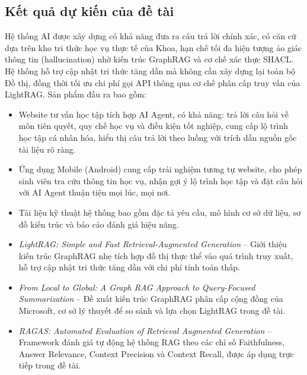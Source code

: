 \documentclass{article}[13pt]
\begin{document}
{    \subsection{Kết quả dự kiến của đề tài}

    Hệ thống AI được xây dựng có khả năng đưa ra câu trả lời chính xác, có căn cứ dựa trên kho tri thức học vụ thực tế của Khoa, hạn chế tối đa hiện tượng ảo giác thông tin (hallucination) nhờ kiến trúc GraphRAG và cơ chế xác thực SHACL. Hệ thống hỗ trợ cập nhật tri thức tăng dần mà không cần xây dựng lại toàn bộ Đồ thị, đồng thời tối ưu chi phí gọi API thông qua cơ chế phân cấp truy vấn của LightRAG. Sản phẩm đầu ra bao gồm:

    \begin{itemize}[label={--}, leftmargin=1.5em]
        \item Website tư vấn học tập tích hợp AI Agent, có khả năng: trả lời câu hỏi về môn tiên quyết, quy chế học vụ và điều kiện tốt nghiệp, cung cấp lộ trình học tập cá nhân hóa, hiển thị câu trả lời theo luồng với trích dẫn nguồn gốc tài liệu rõ ràng.
        \item Ứng dụng Mobile (Android) cung cấp trải nghiệm tương tự website, cho phép sinh viên tra cứu thông tin học vụ, nhận gợi ý lộ trình học tập và đặt câu hỏi với AI Agent thuận tiện mọi lúc, mọi nơi.
        \item Tài liệu kỹ thuật hệ thống bao gồm đặc tả yêu cầu, mô hình cơ sở dữ liệu, sơ đồ kiến trúc và báo cáo đánh giá hiệu năng.
    \end{itemize}

    \begin{itemize}[label={--}, leftmargin=1.5em]
        \item \textit{LightRAG: Simple and Fast Retrieval-Augmented Generation} \cite{lightrag2024} -- Giới thiệu kiến trúc GraphRAG nhẹ tích hợp đồ thị thực thể vào quá trình truy xuất, hỗ trợ cập nhật tri thức tăng dần với chi phí tính toán thấp.
        \item \textit{From Local to Global: A Graph RAG Approach to Query-Focused Summarization} \cite{graphrag2024} -- Đề xuất kiến trúc GraphRAG phân cấp cộng đồng của Microsoft, cơ sở lý thuyết để so sánh và lựa chọn LightRAG trong đề tài.
        \item \textit{RAGAS: Automated Evaluation of Retrieval Augmented Generation} \cite{ragas2023} -- Framework đánh giá tự động hệ thống RAG theo các chỉ số Faithfulness, Answer Relevance, Context Precision và Context Recall, được áp dụng trực tiếp trong đề tài.
    \end{itemize}

}
\end{document}
